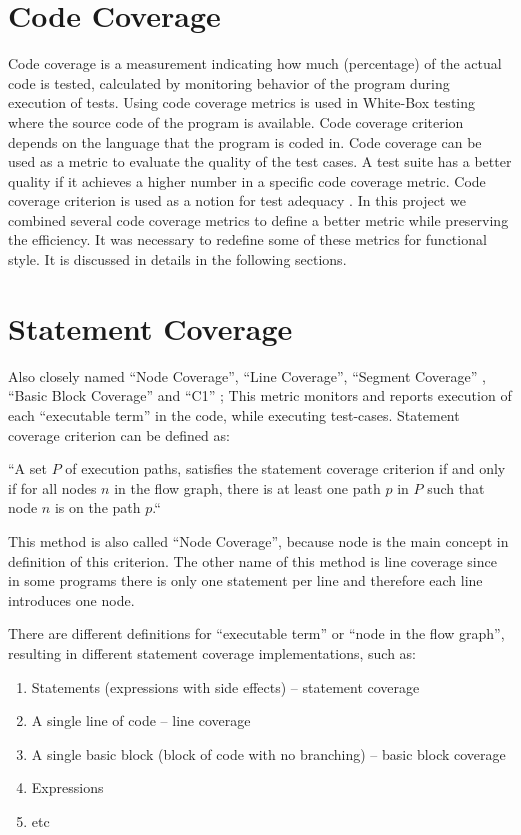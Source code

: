 \documentclass[12pt,a4paper]{report}
\begin{document}
\section{Code Coverage}
Code coverage is a measurement indicating how much (percentage) of the actual code is tested, calculated by monitoring behavior of the program during
 execution of tests. Using code coverage metrics is used in White-Box testing where the source code of the program is available. Code coverage criterion
 depends on the language that the program is coded in. Code coverage can be used as a metric to evaluate the quality of the test cases. A test suite
 has a better quality if it achieves a higher number in a specific code coverage metric. Code coverage criterion is used as a notion for test adequacy
 \cite{Zhu:1997:SUT:267580.267590}.
In this project we combined several code coverage metrics to define a better metric while preserving the efficiency. It was necessary to redefine some
 of these metrics for functional style. It is discussed in details in the following sections.    

\section{Statement Coverage}
Also closely named ``Node Coverage'', ``Line Coverage'', ``Segment Coverage'' \cite{Ntafos:1988:CST:630792.631017},
 ``Basic Block Coverage'' and ``C1'' \cite{beizer2002software};
 This metric monitors and reports
 execution of each “executable term” in the code, while executing test-cases. Statement coverage criterion can
 be defined as: 

“A set $P$ of execution paths, satisfies the statement coverage criterion if and only if for all nodes $n$ in the flow graph, there is at least one path $p$
 in $P$ such that node $n$ is on the path $p$.“\cite{Zhu:1997:SUT:267580.267590}

This method is also called “Node Coverage”, because node is the main concept in definition of this criterion. The other name of this method is line coverage
 since in some programs there is only one statement per line and therefore each line introduces one node.

There are different definitions for “executable term” or “node in the flow graph”, resulting in different statement coverage implementations, such as:

\begin{enumerate}
 \item Statements (expressions with side effects) -- statement coverage
 \item A single line of code -- line coverage
 \item A single basic block (block of code with no branching) -- basic block coverage
 \item Expressions 
 \item etc
\end{enumerate}
\end{document}
